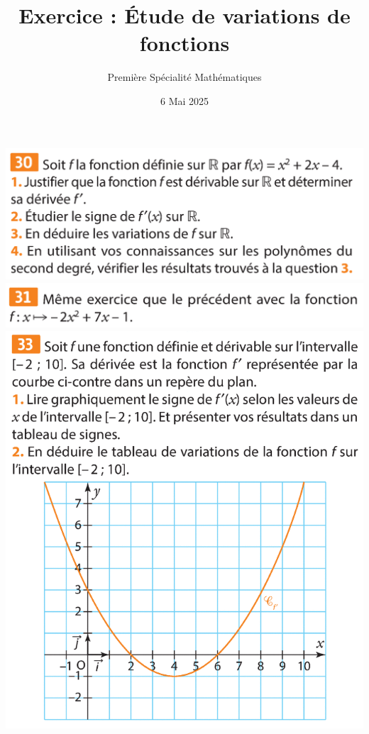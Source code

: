 \documentclass{article}
\title{Exercice : Étude de variations de fonctions}
\date{6 Mai 2025}
\author{Première Spécialité Mathématiques}
\begin{document}
\maketitle
\begin{center}
\begin{minipage}{0.45\textwidth}
\includegraphics[width=\textwidth]{Exercice_1.png}
\includegraphics[width=\textwidth]{Exercice_2.png}
\includegraphics[width=\textwidth]{Exercice_3.png}
\end{minipage}
\hfill\vline\hfill
\begin{minipage}{0.45\textwidth}

\end{minipage}
\end{center}
\end{document}

